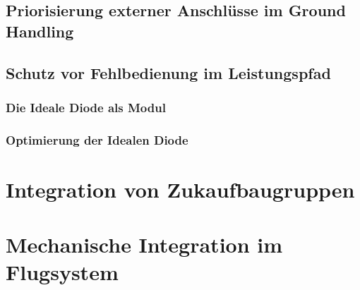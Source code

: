 \subsection{Priorisierung externer Anschlüsse im Ground Handling}

\subsection{Schutz vor Fehlbedienung im Leistungspfad}

\subsubsection{Die Ideale Diode als Modul}

\subsubsection{Optimierung der Idealen Diode}

\section{Integration von Zukaufbaugruppen}

\section{Mechanische Integration im Flugsystem}